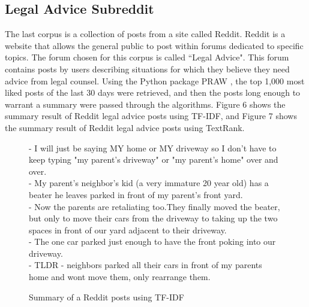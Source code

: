 \documentclass{article}[10]
\begin{document}
\subsection{Legal Advice Subreddit}
The last corpus is a collection of posts from a site called Reddit. Reddit is a website that allows the general public to post within forums dedicated to specific topics. The forum chosen for this corpus is called ``Legal Advice". This forum contains posts by users describing situations for which they believe they need advice from legal counsel. Using the Python package PRAW \cite{PRAW}, the top 1,000 most liked posts of the last 30 days were retrieved, and then the posts long enough to warrant a summary were passed through the algorithms. Figure 6 shows the summary result of Reddit legal advice posts using TF-IDF, and Figure 7 shows the summary result of Reddit legal advice posts using TextRank.

\begin{figure}
    \begin{framed}
        - I will just be saying MY home or MY driveway so I don't have to keep typing "my parent's driveway" or "my parent's home" over and over.\\
        - My parent's neighbor's kid (a very immature 20 year old) has a beater he leaves parked in front of my parent's front yard.\\
        - Now the parents are retaliating too.They finally moved the beater, but only to move their cars from the driveway to taking up the two spaces in front of our yard adjacent to their driveway.\\
        - The one car parked just enough to have the front poking into our driveway.\\
        - TLDR - neighbors parked all their cars in front of my parents home and wont move them, only rearrange them.\\
        \caption{Summary of a Reddit posts using TF-IDF}
        \label{results-tfidf-reddit}
    \end{framed}
\end{figure}
\end{document}
